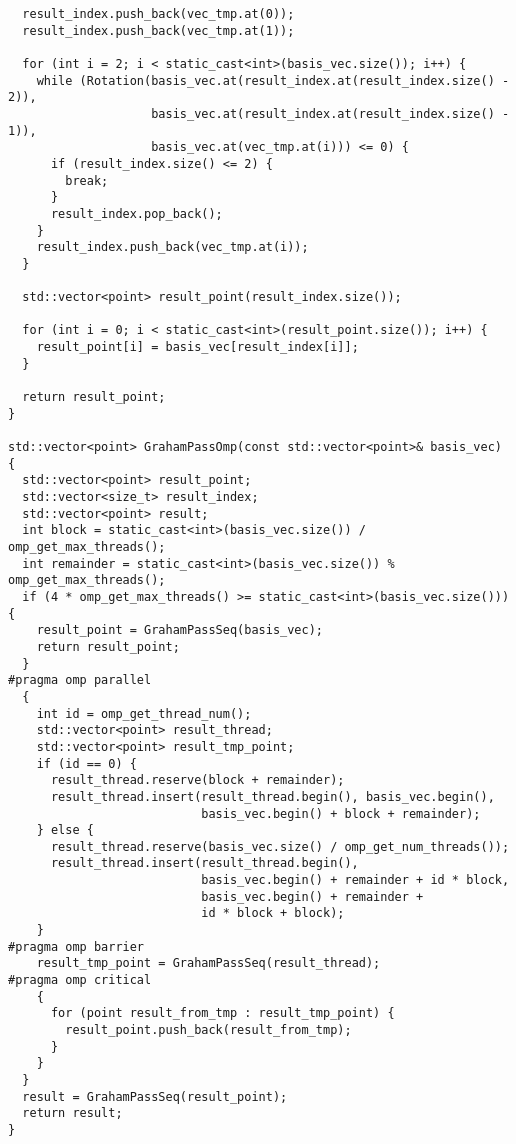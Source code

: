 \documentclass{report}
\begin{document}
\begin{lstlisting}
  result_index.push_back(vec_tmp.at(0));
  result_index.push_back(vec_tmp.at(1));

  for (int i = 2; i < static_cast<int>(basis_vec.size()); i++) {
    while (Rotation(basis_vec.at(result_index.at(result_index.size() - 2)),
                    basis_vec.at(result_index.at(result_index.size() - 1)),
                    basis_vec.at(vec_tmp.at(i))) <= 0) {
      if (result_index.size() <= 2) {
        break;
      }
      result_index.pop_back();
    }
    result_index.push_back(vec_tmp.at(i));
  }

  std::vector<point> result_point(result_index.size());

  for (int i = 0; i < static_cast<int>(result_point.size()); i++) {
    result_point[i] = basis_vec[result_index[i]];
  }

  return result_point;
}

std::vector<point> GrahamPassOmp(const std::vector<point>& basis_vec) {
  std::vector<point> result_point;
  std::vector<size_t> result_index;
  std::vector<point> result;
  int block = static_cast<int>(basis_vec.size()) / omp_get_max_threads();
  int remainder = static_cast<int>(basis_vec.size()) % omp_get_max_threads();
  if (4 * omp_get_max_threads() >= static_cast<int>(basis_vec.size())) {
    result_point = GrahamPassSeq(basis_vec);
    return result_point;
  }
#pragma omp parallel
  {
    int id = omp_get_thread_num();
    std::vector<point> result_thread;
    std::vector<point> result_tmp_point;
    if (id == 0) {
      result_thread.reserve(block + remainder);
      result_thread.insert(result_thread.begin(), basis_vec.begin(),
                           basis_vec.begin() + block + remainder);
    } else {
      result_thread.reserve(basis_vec.size() / omp_get_num_threads());
      result_thread.insert(result_thread.begin(),
                           basis_vec.begin() + remainder + id * block,
                           basis_vec.begin() + remainder +
                           id * block + block);
    }
#pragma omp barrier
    result_tmp_point = GrahamPassSeq(result_thread);
#pragma omp critical
    {
      for (point result_from_tmp : result_tmp_point) {
        result_point.push_back(result_from_tmp);
      }
    }
  }
  result = GrahamPassSeq(result_point);
  return result;
}


\end{lstlisting}
\end{document}
